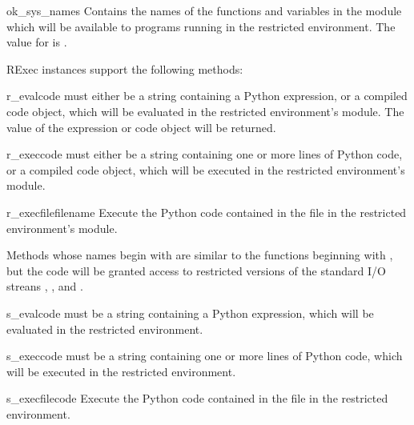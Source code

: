 \begin{datadesc}{ok_sys_names}
Contains the names of the functions and variables in the 
module which will be available to programs running in the restricted
environment.  The value for  is 
   
 .
\end{datadesc}

RExec instances support the following methods:
\renewcommand{\indexsubitem}{(RExec object method)}

\begin{funcdesc}{r_eval}{code}
 must either be a string containing a Python expression, or
a compiled code object, which will be evaluated in the restricted
environment's  module.  The value of the expression or
code object will be returned.
\end{funcdesc}

\begin{funcdesc}{r_exec}{code}
 must either be a string containing one or more lines of
Python code, or a compiled code object, which will be executed in the
restricted environment's  module.
\end{funcdesc}

\begin{funcdesc}{r_execfile}{filename}
Execute the Python code contained in the file  in the
restricted environment's  module.
\end{funcdesc}

Methods whose names begin with  are similar to the functions
beginning with , but the code will be granted access to
restricted versions of the standard I/O streans ,
, and .  

\begin{funcdesc}{s_eval}{code}
 must be a string containing a Python expression, which will
be evaluated in the restricted environment.  
\end{funcdesc}

\begin{funcdesc}{s_exec}{code}
 must be a string containing one or more lines of Python code,
which will be executed in the restricted environment.  
\end{funcdesc}

\begin{funcdesc}{s_execfile}{code}
Execute the Python code contained in the file  in the
restricted environment.
\end{funcdesc}

